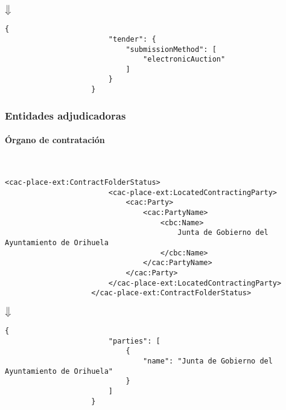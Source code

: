                 \begin{center}
                    $\big\Downarrow$
                \end{center}
                
                \begin{lstlisting}[language=lJSON]
                    {
                        "tender": {
                            "submissionMethod": [
                                "electronicAuction"
                            ]
                        }
                    }
                \end{lstlisting}
        
        \subsubsection{Entidades adjudicadoras}
            \paragraph{Órgano de contratación} \mbox{}\\
                \begin{lstlisting}[language=lXML]
                    <cac-place-ext:ContractFolderStatus>
                        <cac-place-ext:LocatedContractingParty>
                            <cac:Party>
                                <cac:PartyName>
                                    <cbc:Name>
                                        Junta de Gobierno del Ayuntamiento de Orihuela
                                    </cbc:Name>
                                </cac:PartyName>
                            </cac:Party>
                        </cac-place-ext:LocatedContractingParty>
                    </cac-place-ext:ContractFolderStatus>
                \end{lstlisting}
                
                \begin{center}
                    $\big\Downarrow$
                \end{center}
                
                \begin{lstlisting}[language=lJSON]
                    {
                        "parties": [
                            {
                                "name": "Junta de Gobierno del Ayuntamiento de Orihuela"
                            }
                        ]
                    }
                \end{lstlisting}
                
